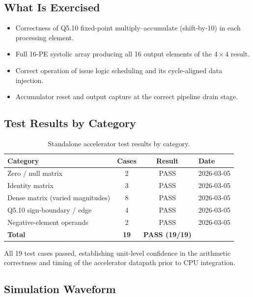 ﻿\documentclass[12pt,a4paper]{report}
\renewcommand{\arraystretch}{1.2}
\begin{document}
\subsection{What Is Exercised}

\begin{itemize}
    \item Correctness of Q5.10 fixed-point multiply–accumulate (shift-by-10) in each processing element.
    \item Full 16-PE systolic array producing all 16 output elements of the $4 \times 4$ result.
    \item Correct operation of issue logic scheduling and its cycle-aligned data injection.
    \item Accumulator reset and output capture at the correct pipeline drain stage.
\end{itemize}

\subsection{Test Results by Category}

\begin{table}[H]
\centering
\small
\setlength{\tabcolsep}{8pt}
\renewcommand{\arraystretch}{1.3}
\begin{tabular}{lccl}
\toprule
\textbf{Category} & \textbf{Cases} & \textbf{Result} & \textbf{Date} \\
\midrule
Zero / null matrix             & 2  & PASS & 2026-03-05 \\
Identity matrix                & 3  & PASS & 2026-03-05 \\
Dense matrix (varied magnitudes) & 8 & PASS & 2026-03-05 \\
Q5.10 sign-boundary / edge     & 4  & PASS & 2026-03-05 \\
Negative-element operands      & 2  & PASS & 2026-03-05 \\
\midrule
\textbf{Total}                 & \textbf{19} & \textbf{PASS (19/19)} & \\
\bottomrule
\end{tabular}
\caption{Standalone accelerator test results by category.}
\label{tab:standalone_tests}
\end{table}

All 19 test cases passed, establishing unit-level confidence in the arithmetic correctness and timing of the accelerator datapath prior to CPU integration.

\subsection{Simulation Waveform}
\end{document}
